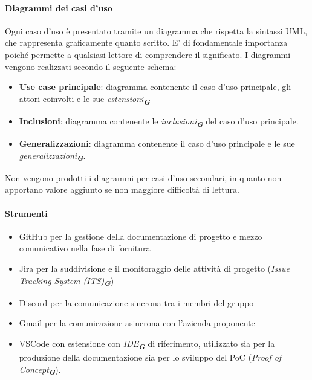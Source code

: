 \documentclass[a4paper,12pt]{article}
\newcommand{\glossario}[1]{\textit{#1}\textsubscript{\textbf{\textit{\textcolor{lightblack}{G}}}}}
\begin{document}
\paragraph{Diagrammi dei casi d'uso}
Ogni caso d'uso è presentato tramite un diagramma che rispetta la sintassi UML, che rappresenta graficamente quanto scritto. E' di fondamentale importanza poiché permette a qualsiasi lettore di comprendere il significato.
I diagrammi vengono realizzati secondo il seguente schema:
\begin{itemize}
    \item \textbf{Use case principale}: diagramma contenente il caso d'uso principale, gli attori coinvolti e le sue \glossario{estensioni}
    \item \textbf{Inclusioni}: diagramma contenente le \glossario{inclusioni} del caso d'uso principale.
    \item \textbf{Generalizzazioni}: diagramma contenente il caso d'uso principale e le sue \glossario{generalizzazioni}.
\end{itemize}
Non vengono prodotti i diagrammi per casi d'uso secondari, in quanto non apportano valore aggiunto se non maggiore difficoltà di lettura.


\paragraph{Strumenti}
\begin{itemize}
    \item GitHub per la gestione della documentazione di progetto e mezzo comunicativo nella fase di fornitura
    \item Jira per la suddivisione e il monitoraggio delle attività di progetto (\glossario{Issue Tracking System (ITS)})
    \item Discord per la comunicazione sincrona tra i membri del gruppo
    \item Gmail per la comunicazione asincrona con l'azienda proponente
    \item VSCode con estensione con \glossario{IDE} di riferimento, utilizzato sia per la produzione della documentazione sia per lo sviluppo del PoC (\glossario{Proof of Concept}).
\end{itemize}
\end{document}
